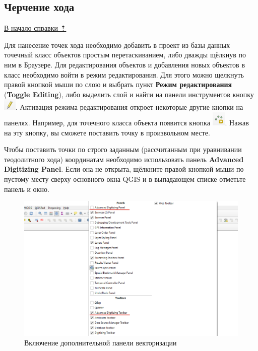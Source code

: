 \documentclass[
  12pt,
]{book}
\begin{document}
\subsection{Черчение хода}\label{practice-theod-draw}

\hyperref[practice-theod]{В начало справки ⇡}

Для нанесение точек хода необходимо добавить в проект из базы данных точечный класс объектов простым перетаскиванием, либо дважды щёлкнув по ним в Браузере. Для редактирования объектов и добавления новых объектов в класс необходимо войти в режим редактирования. Для этого можно щелкнуть правой кнопкой мыши по слою и выбрать пункт \textbf{Режим редактирования} (\textbf{Toggle Editing}), либо выделить слой и найти на панели инструментов кнопку \includegraphics{images/Practice/Edit.png}. Активация режима редактирования откроет некоторые другие кнопки на панелях. Например, для точечного класса объекта появится кнопка \includegraphics{images/Practice/New_points.png}. Нажав на эту кнопку, вы сможете поставить точку в произвольном месте.

Чтобы поставить точки по строго заданным (рассчитанным при уравнивании теодолитного хода) координатам необходимо использовать панель \textbf{Advanced Digitizing Panel}. Если она не открыта, щёлкните правой кнопкой мыши по пустому месту сверху основного окна QGIS и в выпадающем списке отметьте панель и окно.

\begin{figure}
\centering
\includegraphics{images/Practice/Advanced_digitizing.png}
\caption{Включение дополнительной панели векторизации}
\end{figure}
\end{document}

